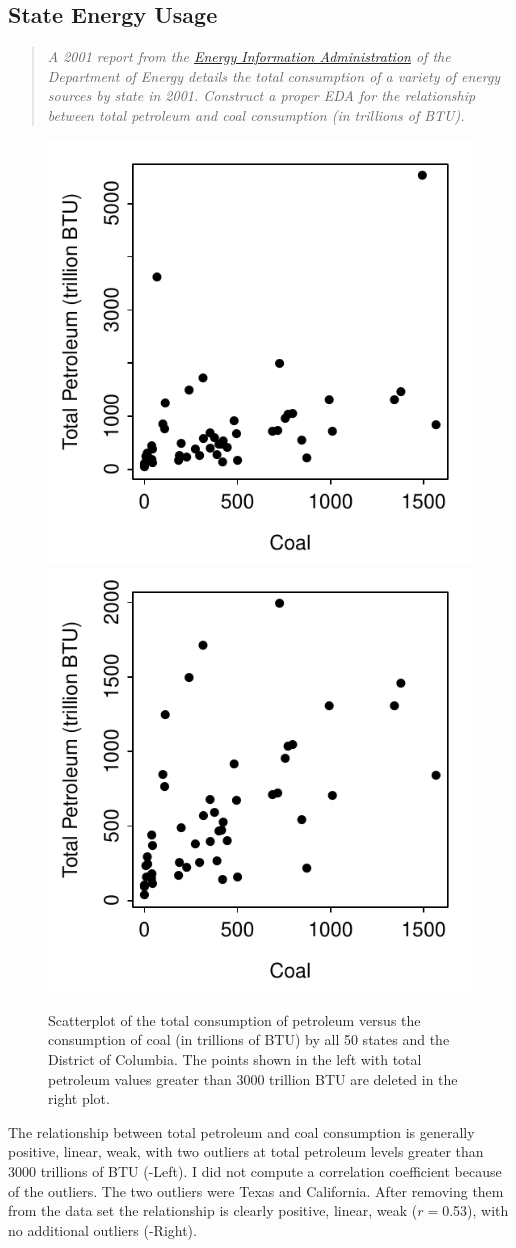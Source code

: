 \documentclass[10pt,openany]{book}\usepackage[]{graphicx}\usepackage[]{color}
\newenvironment{knitrout}{}{} %
\begin{document}
\subsection{State Energy Usage}
\vspace{-6pt}
\begin{quote}
\textit{A 2001 report from the \href{http://www.eia.doe.gov/}{Energy Information Administration} of the Department of Energy details the total consumption of a variety of energy sources by state in 2001.  Construct a proper EDA for the relationship between total petroleum and coal consumption (in trillions of BTU).}
\end{quote}
\begin{knitrout}
\color{fgcolor}\begin{figure}[hbtp]

{\centering \includegraphics[width=.4\linewidth]{Figs/scatNRG1-1} 
\includegraphics[width=.4\linewidth]{Figs/scatNRG1-2} 

}

\caption[Scatterplot of the total consumption of petroleum versus the consumption of coal (in trillions of BTU) by all 50 states and the District of Columbia]{Scatterplot of the total consumption of petroleum versus the consumption of coal (in trillions of BTU) by all 50 states and the District of Columbia.  The points shown in the left with total petroleum values greater than 3000 trillion BTU are deleted in the right plot.}\label{fig:scatNRG1}
\end{figure}


\end{knitrout}
The relationship between total petroleum and coal consumption is generally positive, linear, weak, with two outliers at total petroleum levels greater than 3000 trillions of BTU (-Left).  I did not compute a correlation coefficient because of the outliers.  The two outliers were Texas and California.  After removing them from the data set the relationship is clearly positive, linear, weak ($r=$0.53), with no additional outliers (-Right).
\end{document}
